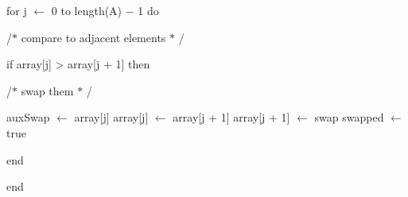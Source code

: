 \documentclass[12pt]{article}
\begin{document}
\begin{adjustwidth}{0.54in}{0.0in}
{\fontsize{11pt}{13.2pt}\selectfont for  j $ \leftarrow $  0 to length(A) $-$  1 do\par}\par

\end{adjustwidth}

\begin{adjustwidth}{0.77in}{0.0in}
{\fontsize{11pt}{13.2pt}\selectfont /$\ast$  compare  to adjacent  elements $\ast$ /\par}\par

\end{adjustwidth}

\begin{adjustwidth}{0.77in}{0.0in}
{\fontsize{11pt}{13.2pt}\selectfont if array[j]  > array[j  + 1] then\par}\par

\end{adjustwidth}

\begin{adjustwidth}{1.01in}{0.0in}
{\fontsize{11pt}{13.2pt}\selectfont /$\ast$  swap them $\ast$ /\par}\par

\end{adjustwidth}

\begin{adjustwidth}{1.01in}{4.68in}
{\fontsize{11pt}{13.2pt}\selectfont auxSwap  $ \leftarrow $  array[j] array[j] $ \leftarrow $  array[j  + 1] array[j  + 1] $ \leftarrow $  swap swapped  $ \leftarrow $  true\par}\par

\end{adjustwidth}

\begin{adjustwidth}{0.77in}{0.0in}
{\fontsize{11pt}{13.2pt}\selectfont end\par}\par

\end{adjustwidth}

\begin{adjustwidth}{0.54in}{0.0in}
{\fontsize{11pt}{13.2pt}\selectfont end\par}\par

\end{adjustwidth}
\end{document}
